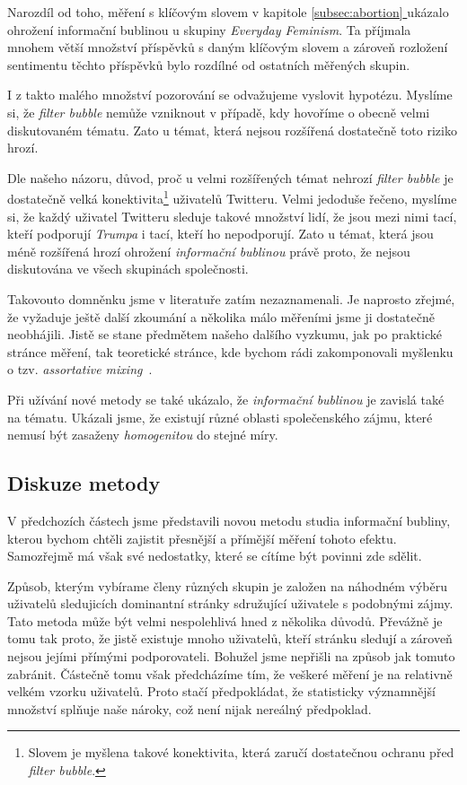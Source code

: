 \documentclass[12pt, a4paper]{article}
\newcommand*{\fullref}[1]{\hyperref[{#1}]{\ref*{#1} \nameref*{#1}}} %
\numberwithin{equation}{section} 	%
\begin{document}
Narozdíl od toho, měření s klíčovým slovem \textit{} v kapitole \fullref{subsec:abortion} ukázalo ohrožení informační bublinou u skupiny \textit{Everyday Feminism}. Ta příjmala mnohem větší množství příspěvků s daným klíčovým slovem a zároveň rozložení sentimentu těchto příspěvků bylo rozdílné od ostatních měřených skupin.

I z takto malého množství pozorování se odvažujeme vyslovit hypotézu. Myslíme si, že \textit{filter bubble} nemůže vzniknout v případě, kdy hovoříme o obecně velmi diskutovaném tématu. Zato u témat, která nejsou rozšířená dostatečně toto riziko hrozí.

Dle našeho názoru, důvod, proč u velmi rozšířených témat nehrozí \textit{filter bubble} je dostatečně velká konektivita\footnote{Slovem \textit{} je myšlena takové konektivita, která zaručí dostatečnou ochranu před \textit{filter bubble}.} uživatelů Twitteru. Velmi jedoduše řečeno, myslíme si, že každý uživatel Twitteru sleduje takové množství lidí, že jsou mezi nimi tací, kteří podporují \textit{Trumpa} i tací, kteří ho nepodporují. Zato u témat, která jsou méně rozšířená hrozí ohrožení \textit{informační bublinou} právě proto, že nejsou diskutována ve všech skupinách společnosti.

Takovouto domněnku jsme v literatuře zatím nezaznamenali. Je naprosto zřejmé, že vyžaduje ještě další zkoumání a několika málo měřeními jsme ji dostatečně neobhájili. Jistě se stane předmětem našeho dalšího vyzkumu, jak po praktické stránce měření, tak teoretické stránce, kde bychom rádi zakomponovali myšlenku o tzv. \textit{assortative mixing}~\cite{AssortativeMixing-soc, AssortativeMixing-E}.

Při užívání nové metody se také ukázalo, že \textit{informační bublinou} je zavislá také na tématu. Ukázali jsme, že existují různé oblasti společenského zájmu, které nemusí být zasaženy \textit{homogenitou} do stejné míry.

\subsection{Diskuze metody}
\noindent V předchozích částech jsme představili novou metodu studia informační bubliny, kterou bychom chtěli zajistit přesnější a přímější měření tohoto efektu. Samozřejmě má však své nedostatky, které se cítíme být povinni zde sdělit.

Způsob, kterým vybírame členy různých skupin je založen na náhodném výběru uživatelů sledujicích dominantní stránky sdružující uživatele s podobnými zájmy. Tato metoda může být velmi nespolehlivá hned z několika důvodů. Převážně je tomu tak proto, že jistě existuje mnoho uživatelů, kteří stránku sledují a zároveň nejsou jejími přímými podporovateli. Bohužel jsme nepřišli na způsob jak tomuto zabránit. Částečně tomu však předcházíme tím, že veškeré měření je na relativně velkém vzorku uživatelů. Proto stačí předpokládat, že statisticky významnější množství splňuje naše nároky, což není nijak nereálný předpoklad.
\end{document}
